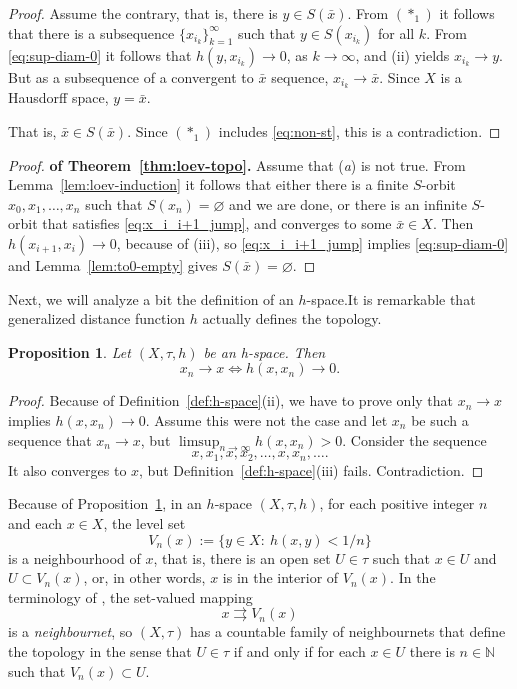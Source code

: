 \documentclass[12pt]{article}
\newtheorem{proposition}[theorem]{Proposition}
\newcommand{\astone}{(\ast_1)}
\renewcommand{\emptyset}{\varnothing}
\begin{document}
\begin{proof}
    Assume the contrary, that is, there is $y\in S(\bar x)$. From $\astone$ it follows that there is a subsequence $\{x_{i_k}\}_{k=1}^\infty$ such that $y\in S(x_{i_k})$ for all $k$. From \eqref{eq:sup-diam-0} it follows that $h(y,x_{i_k})\to0$, as $k\to\infty$, and (ii)  yields $x_{i_k}\to y$. But as a subsequence of a convergent to $\bar x$ sequence, $x_{i_k}\to \bar x$. Since $X$ is a Hausdorff space, $y= \bar x$.

    That is, $\bar x \in S(\bar x)$. Since $\astone$ includes \eqref{eq:non-st}, this is a contradiction.
\end{proof}

\begin{proof}\textbf{of Theorem~\ref{thm:loev-topo}.}
Assume that (\emph{a}) is not true. From Lemma~\ref{lem:loev-induction} it follows that either there is a finite $S$-orbit $x_0,x_1,\ldots,x_n$ such that $S(x_n) = \emptyset$ and we are done, or there is an infinite $S$-orbit that satisfies \eqref{eq:x_i_i+1_jump}, and converges to some $\bar x\in X$. Then $h(x_{i+1},x_i)\to 0$, because of (iii), so \eqref{eq:x_i_i+1_jump} implies \eqref{eq:sup-diam-0} and Lemma~\ref{lem:to0-empty} gives $S(\bar x) = \emptyset$.
\end{proof}

Next, we will analyze a bit the definition of an $h$-space.It is remarkable that generalized distance function $h$ actually defines the topology.
\begin{proposition}
    \label{prop:h-def-top}
    Let $(X,\tau,h)$ be an h-space. Then
    \begin{equation}
        \label{eq:ii-prim}
        x_n\to x \iff h(x,x_n)\to 0.
    \end{equation}
\end{proposition}
\begin{proof}
    Because of  Definition~\ref{def:h-space}(ii), we have to prove only that $x_n\to x$ implies $h(x,x_n)\to0$. Assume this were not the case and let $x_n$ be such a sequence that $x_n\to x$, but $\limsup_{n\to\infty} h(x,x_n)>0$. Consider the sequence
    $$
        x,x_1,x,x_2,\ldots,x,x_n,\ldots.
    $$
    It also converges to $x$, but Definition~\ref{def:h-space}(iii) fails. Contradiction.
\end{proof}

Because of Proposition~\ref{prop:h-def-top}, in an $h$-space $(X,\tau,h)$, for each positive integer $n$ and each $x\in X$, the level set
\begin{equation}
    \label{eq:v_n-h-def}
    V_n(x) := \{y\in X:\ h(x,y) < 1/n\}
\end{equation}
is a neighbourhood of $x$, that is, there is an open  set $U\in \tau$ such that $x\in U$ and $U\subset V_n(x)$, or, in other words, $x$ is in the interior of $V_n(x)$. In the terminology of \cite{Junnila}, the set-valued mapping
$$
    x\rightrightarrows V_n(x)
$$
is a \textit{neighbournet}, so $(X,\tau)$ has a countable family of neighbournets that define the topology in the sense that $U\in\tau$ if and only if for each $x\in U$ there is $n\in\mathbb{N}$ such that $V_n(x)\subset U$.
\end{document}
